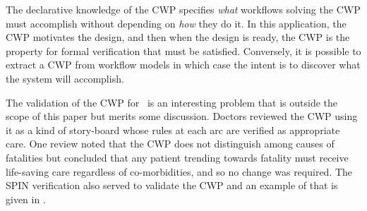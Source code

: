 The declarative knowledge of the CWP specifies \emph{what} workflows solving the CWP must accomplish without depending on \emph{how} they do it. In this application, the CWP motivates the design, and then when the design is ready, the CWP is the property for formal verification that must be satisfied. Conversely, it is possible to extract a CWP from workflow models in which case the intent is to discover what the system will accomplish. 

The validation of the CWP for \phware\ is an interesting problem that is outside the scope of this paper but merits some discussion. Doctors reviewed the CWP using it as a kind of story-board whose rules at each arc are verified as appropriate care. One review noted that the CWP does not distinguish among causes of fatalities but concluded that any patient trending towards fatality must receive life-saving care regardless of co-morbidities, and so no change was required. The SPIN verification also served to validate the CWP and an example of that is given in .

